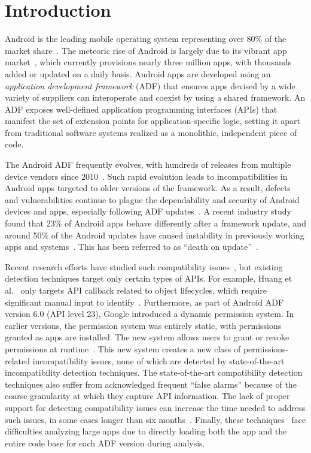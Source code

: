 \section{Introduction}\label{sec-intro}
\sloppy
Android is the leading mobile operating system representing over 80\% of the
market share~\cite{androidmarketstatistics}. The meteoric rise of Android is
largely due to its vibrant app market~\cite{googleplayapps}, which currently
provisions nearly three million apps, with thousands added or updated on a
daily basis.  Android apps are developed using an \emph{application development
framework} (ADF) that ensures apps devised by a wide variety of suppliers can
interoperate and coexist by using a shared framework. 
An ADF exposes well-defined application programming interfaces (APIs) that manifest the set of extension points for application-specific logic, setting it apart from traditional software systems realized as a monolithic, independent piece of code.

The Android ADF frequently evolves, with hundreds of releases from multiple device vendors since 2010~\cite{AndroidReleases}.
Such rapid evolution leads to incompatibilities in Android apps targeted to older versions of the framework.  
As a result, defects and vulnerabilities continue to plague the dependability and security of Android devices and apps, especially following ADF updates~\cite{linares2014api,Update4}. 
A recent industry study found that 23\% of Android apps behave differently after a framework update, and around 50\% of the Android updates have caused instability in previously working apps and systems~\cite{Helppi2014}. 
This has been referred to as ``death on update''~\cite{death1,death2,death3,death4,iOS,youtube}.

Recent research efforts have studied such compatibility issues~\cite{huang2018understanding,wei2016taming,wu2017measuring}, but existing detection techniques target only certain types of APIs.  
For example, Huang et al.~\cite{huang2018understanding} only targets API callback related to object lifecycles, which require significant manual input to identify~\cite{huang2018understanding,wu2017measuring}.
Furthermore, as part of Android ADF version 6.0 (API level 23), Google introduced a dynamic permission system.
In earlier versions, the permission system was entirely static, with permissions granted as apps are installed.
The new system allows users to grant or revoke permissions at runtime~\cite{permissiongroups}.
This new system creates a new class of permissions-related incompatibility issues, none of which are detected by state-of-the-art incompatibility detection techniques.
The state-of-the-art compatibility detection techniques also suffer from acknowledged frequent ``false alarms'' because of the coarse granularity at which they capture API information.  
The lack of proper support for detecting compatibility issues can increase the time needed to address such issues, in some cases longer than six  months~\cite{siliconangle}.
Finally, these techniques~\cite{huang2018understanding,he2018understanding} face difficulties analyzing large apps due to directly loading both the app and the entire code base for each ADF version during analysis.

